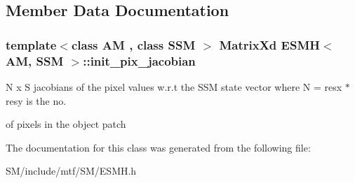 \subsection{Member Data Documentation}
\hypertarget{classESMH_a705f1088f5a2a311463bfb9c59967941}{
\subsubsection[{init\-\_\-pix\-\_\-jacobian}]{\setlength{\rightskip}{0pt plus 5cm}template$<$class A\-M , class S\-S\-M $>$ Matrix\-Xd {\bf E\-S\-M\-H}$<$ A\-M, S\-S\-M $>$\-::init\-\_\-pix\-\_\-jacobian}}\label{classESMH_a705f1088f5a2a311463bfb9c59967941}


N x S jacobians of the pixel values w.\-r.\-t the S\-S\-M state vector where N = resx $\ast$ resy is the no. 

of pixels in the object patch 

The documentation for this class was generated from the following file\-:\begin{DoxyCompactItemize}
\item 
S\-M/include/mtf/\-S\-M/E\-S\-M\-H.\-h\end{DoxyCompactItemize}
